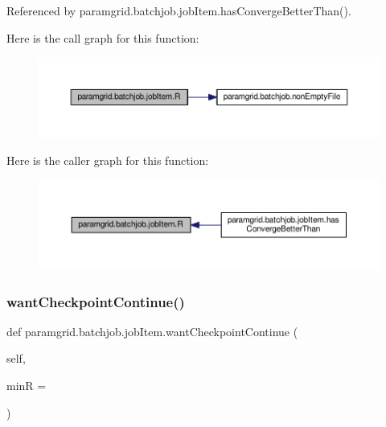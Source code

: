 Referenced by paramgrid.\+batchjob.\+job\+Item.\+has\+Converge\+Better\+Than().

Here is the call graph for this function\+:
\nopagebreak
\begin{figure}[H]
\begin{center}
\leavevmode
\includegraphics[width=350pt]{classparamgrid_1_1batchjob_1_1jobItem_aae8ea692f441626dcdebd9c9fbf687e7_cgraph}
\end{center}
\end{figure}
Here is the caller graph for this function\+:
\nopagebreak
\begin{figure}[H]
\begin{center}
\leavevmode
\includegraphics[width=350pt]{classparamgrid_1_1batchjob_1_1jobItem_aae8ea692f441626dcdebd9c9fbf687e7_icgraph}
\end{center}
\end{figure}
\mbox{\label{classparamgrid_1_1batchjob_1_1jobItem_aa728ccb7030aaa62a0bc94544aac3997}} 
\subsubsection{\texorpdfstring{want\+Checkpoint\+Continue()}{wantCheckpointContinue()}}
{\footnotesize\ttfamily def paramgrid.\+batchjob.\+job\+Item.\+want\+Checkpoint\+Continue (\begin{DoxyParamCaption}\item[{}]{self,  }\item[{}]{minR = {} }\end{DoxyParamCaption})}



